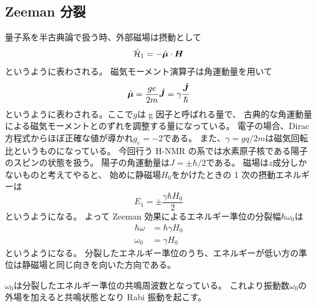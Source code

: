\documentclass[11pt,dvipdfmx,a4paper]{jsarticle}
\begin{document}
\subsection{Zeeman 分裂}
量子系を半古典論で扱う時、外部磁場は摂動として
\begin{equation}
	\hat{\mathcal{H}}_1 = -\hat{\vb*{\mu}}\cdot \vb*{H}
\end{equation}
というように表わされる。
磁気モーメント演算子は角運動量を用いて
\begin{equation}
	\hat{\vb*{\mu}} = \frac{ge}{2m}\hat{\vb*{J}} = \gamma\frac{\hat{\vb*{J}}}{\hbar}
\end{equation}
というように表わされる。ここで\(g\)は g 因子と呼ばれる量で、
古典的な角運動量による磁気モーメントとのずれを調整する量になっている。
電子の場合、Dirac 方程式からほぼ正確な値が導かれ\(g_e = - 2\)である。
また、\(\gamma = gq/2m\)は磁気回転比というものになっている。
今回行う H-NMR の系では水素原子核である陽子のスピンの状態を扱う。
陽子の角運動量は\(J=\pm\hbar/2\)である。
磁場は\(z\)成分しかないものと考えてやると、
始めに静磁場\(H_0\)をかけたときの 1 次の摂動エネルギーは
\begin{equation}
	E_1 = \pm\frac{\gamma\hbar H_0}{2}
\end{equation}
というようになる。
よって Zeeman 効果によるエネルギー準位の分裂幅\(\hbar\omega_0\)は
\begin{align}
	\hbar\omega &= \hbar \gamma H_0\\
	\omega_0 &= \gamma H_0
\end{align}
というようになる。
分裂したエネルギー準位のうち、エネルギーが低い方の準位は静磁場と同じ向きを向いた方向である。

\(\omega_0\)は分裂したエネルギー準位の共鳴周波数となっている。
これより振動数\(\omega_0\)の外場を加えると共鳴状態となり Rabi 振動を起こす。
\end{document}
